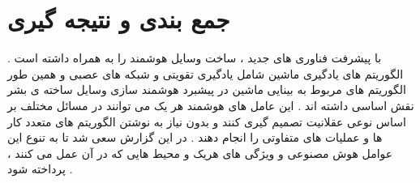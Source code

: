 \chapter{جمع بندی و نتیجه گیری}
با پیشرفت فناوری های جدید ، ساخت وسایل هوشمند را به همراه داشته است . الگوریتم های یادگیری ماشین شامل یادگیری تقویتی و شبکه های عصبی و همین طور الگوریتم های مربوط به بینایی ماشین در پیشبرد هوشمند سازی وسایل ساخته ی بشر نقش اساسی داشته اند . این عامل های هوشمند هر یک می توانند در مسائل مختلف بر اساس نوعی عقلانیت تصمیم گیری کنند و بدون نیاز به نوشتن الگوریتم های متعدد کار ها و عملیات های متفاوتی را انجام دهند . در این گزارش سعی شد تا به تنوع این عوامل هوش مصنوعی و ویژگی های هریک و محیط هایی که در آن عمل می کنند ، پرداخته  شود .  